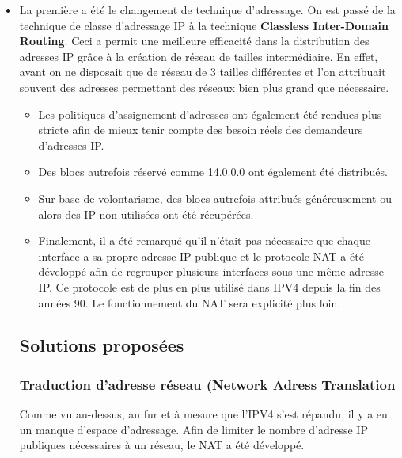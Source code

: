 \begin{itemize}
\item La première a été le changement de technique d'adressage. On est passé de la
technique de classe d'adressage IP à la technique \textbf{Classless Inter-Domain
Routing}. Ceci a permit une meilleure efficacité dans la distribution des
adresses IP grâce à la création de réseau de tailles intermédiaire. En effet,
avant on ne disposait que de réseau de 3 tailles différentes et l'on attribuait
souvent des adresses permettant des réseaux bien plus grand que nécessaire.

\begin{itemize}
\item Les politiques d'assignement d'adresses ont également été rendues plus stricte
afin de mieux tenir compte des besoin réels des demandeurs d'adresses IP.

\item Des blocs autrefois réservé comme 14.0.0.0 ont également été distribués.

\item Sur base de volontarisme, des blocs autrefois attribués généreusement ou alors
des IP non utilisées ont été récupérées.

\item Finalement, il a été remarqué qu'il n'était pas nécessaire que chaque interface
a sa propre adresse IP publique et le protocole NAT a été développé afin de regrouper
plusieurs interfaces sous une même adresse IP. Ce protocole est de plus en plus
utilisé dans IPV4 depuis la fin des années 90. Le fonctionnement du NAT sera explicité
plus loin.
\end{itemize}


\subsection{ Solutions proposées }

\subsubsection{Traduction d'adresse réseau (Network Adress Translation}
Comme vu au-dessus, au fur et à mesure que l'IPV4 s'est répandu, il y a eu un manque
d'espace d'adressage. Afin de limiter le nombre d'adresse IP publiques nécessaires
à un réseau, le NAT a été développé.


\end{itemize}
